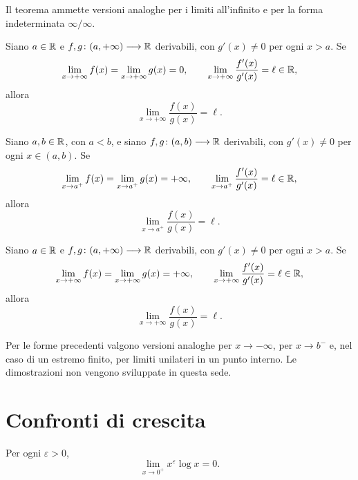 Il teorema ammette versioni analoghe per i limiti
all'infinito e per la forma indeterminata
\(\infty/\infty\).

\begin{theorem}
\label{thm:lez23-hopital-zero-infinito}
Siano \(a\in\mathbb{R}\) e \(f,g\colon(a,+\infty)\longrightarrow\mathbb{R}\)
derivabili, con \(g'(x)\ne0\) per ogni \(x>a\).
Se
\[
  \lim_{x\to+\infty}f(x)
  =\lim_{x\to+\infty}g(x)=0,
  \qquad
  \lim_{x\to+\infty}\frac{f'(x)}{g'(x)}=\ell\in\mathbb{R},
\]
allora
\[
  \lim_{x\to+\infty}\frac{f(x)}{g(x)}=\ell.
\]
\end{theorem}

\clearpage

\begin{theorem}
\label{thm:lez23-hopital-infinito-estremo}
Siano \(a,b\in\mathbb{R}\), con \(a<b\), e siano
\(f,g\colon(a,b)\longrightarrow\mathbb{R}\) derivabili,
con \(g'(x)\ne0\) per ogni \(x\in(a,b)\).
Se
\[
  \lim_{x\to a^+}f(x)
  =\lim_{x\to a^+}g(x)=+\infty,
  \qquad
  \lim_{x\to a^+}\frac{f'(x)}{g'(x)}=\ell\in\mathbb{R},
\]
allora
\[
  \lim_{x\to a^+}\frac{f(x)}{g(x)}=\ell.
\]
\end{theorem}

\begin{theorem}
\label{thm:lez23-hopital-infinito}
Siano \(a\in\mathbb{R}\) e \(f,g\colon(a,+\infty)\longrightarrow\mathbb{R}\)
derivabili, con \(g'(x)\ne0\) per ogni \(x>a\).
Se
\[
  \lim_{x\to+\infty}f(x)
  =\lim_{x\to+\infty}g(x)=+\infty,
  \qquad
  \lim_{x\to+\infty}\frac{f'(x)}{g'(x)}=\ell\in\mathbb{R},
\]
allora
\[
  \lim_{x\to+\infty}\frac{f(x)}{g(x)}=\ell.
\]
\end{theorem}

Per le forme precedenti valgono versioni analoghe
per \(x\to-\infty\), per \(x\to b^-\) e, nel caso
di un estremo finito, per limiti unilateri in un
punto interno. Le dimostrazioni non vengono
sviluppate in questa sede.

\section{Confronti di crescita}
\label{sec:lez23-confronti-crescita}

\begin{proposition}
\label{prop:lez23-logaritmo-potenza}
Per ogni \(\varepsilon>0\),
\[
  \lim_{x\to0^+}x^\varepsilon\log x=0.
\]
\end{proposition}

